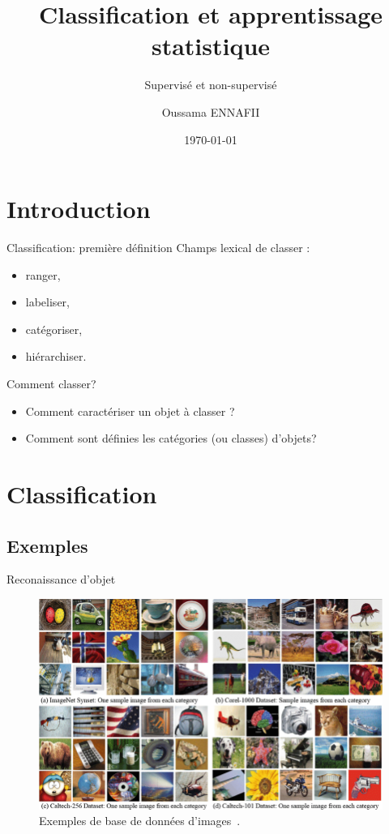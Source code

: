 \documentclass[8pt]{beamer}
\title{Classification et apprentissage statistique}
\subtitle{Supervisé et non-supervisé}
\author{Oussama ENNAFII}
\institute{ENSG}
\date{\today}
\begin{document}
	\begin{frame}[plain]
		\titlepage{}
	\end{frame}

	\section{Introduction}
		\begin{frame}{Classification: première définition}
			Champs lexical de classer :
			\begin{itemize}
				\item<2-> ranger,
				\item<3-> labeliser,
				\item<4-> catégoriser,
				\item<5-> hiérarchiser.
			\end{itemize}
		\end{frame}
		
		\begin{frame}{Comment classer?}
			\begin{itemize}
					\item<1-> Comment caractériser un objet à classer ?
					\item<2-> Comment sont définies les catégories (ou classes) d'objets?
			\end{itemize}
		\end{frame}
	
	\section{Classification}
		\subsection{Exemples}
			\begin{frame}{Reconaissance d'objet}
				\begin{figure}[H]
					\includegraphics[width=.7\textwidth]{images/samples/image_datasets}
					\caption*{\tiny Exemples de base de données d'images~\cite{ahmed2017fusion}.}
				\end{figure}
			\end{frame}
			
\end{document}
